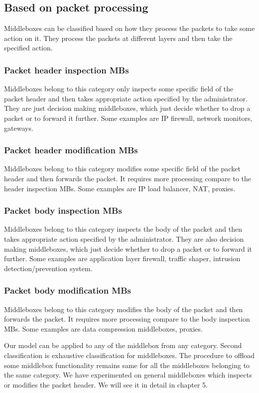 \documentclass[a4paper,11pt]{report}
\begin{document}
\subsection{Based on packet processing}
Middleboxes can be classified based on how they process the packets to take some action on it. They process the packets at different layers and then take the specified action. 
\subsubsection{Packet header inspection MBs}
Middleboxes belong to this category only inspects some specific field of the packet header and then takes appropriate action specified by the administrator. They are just decision making middleboxes, which just decide whether to drop a packet or to forward it further. Some examples are IP firewall, network monitors, gateways.     
\subsubsection{Packet header modification MBs}
Middleboxes belong to this category modifies some specific field of the packet header and then forwards the packet. It requires more processing compare to the header inspection MBs. Some examples are IP load balancer, NAT, proxies. 
\subsubsection{Packet body inspection MBs}
Middleboxes belong to this category inspects the body of the packet and then takes appropriate action specified by the administrator. They are also decision making middleboxes, which just decide whether to drop a packet or to forward it further. Some examples are application layer firewall, traffic shaper, intrusion detection/prevention system.
\subsubsection{Packet body modification MBs}
Middleboxes belong to this category modifies the body of the packet and then forwards the packet. It requires more processing compare to the body inspection MBs. Some examples are data compression middleboxes, proxies.

\bigskip
Our model can be applied to any of the middlebox from any category. Second classification is exhaustive classification for middleboxes. The procedure to offload some middlebox functionality remains same for all the middleboxes belonging to the same category. We have experimented on general middleboxes which inspects or modifies the packet header. We will see it in detail in chapter 5.   
\end{document}
